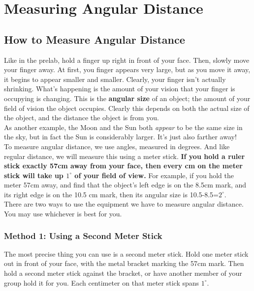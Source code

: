 \documentclass[11pt]{article}
\begin{document}
\newpage

\section{Measuring Angular Distance}

\subsection{How to Measure Angular Distance}
Like in the prelab, hold a finger up right in front of your face. Then, slowly move your finger away. At first, you finger appears very large, but as you move it away, it begins to appear smaller and smaller. Clearly, your finger isn't actually shrinking. What's happening is the amount of your vision that your finger is occupying is changing. This is the \textbf{angular size} of an object; the amount of your field of vision the object occupies. Clearly this depends on both the actual size of the object, and the distance the object is from you.\\

As another example, the Moon and the Sun both \textit{appear} to be the same size in the sky, but in fact the Sun is considerably larger. It's just also farther away!\\

To measure angular distance, we use angles, measured in degrees. And like regular distance, we will measure this using a meter stick. \textbf{If you hold a ruler stick exactly 57cm away from your face, then every cm on the meter stick will take up $1^\circ$ of your field of view.} For example, if you hold the meter 57cm away, and find that the object's left edge is on the 8.5cm mark, and its right edge is on the 10.5 cm mark, then its angular size is 10.5-8.5=$2^\circ$.\\

There are two ways to use the equipment we have to measure angular distance. You may use whichever is best for you.

\subsubsection{Method 1: Using a Second Meter Stick}

The most precise thing you can use is a second meter stick. Hold one meter stick out in front of your face, with the metal bracket marking the 57cm mark. Then hold a second meter stick against the bracket, or have another 
member of your group hold it for you. Each centimeter on that meter stick spans $1^\circ$.
\end{document}
